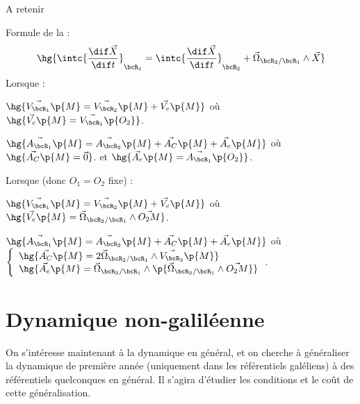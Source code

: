     \begin{form}{A retenir}{}
        \begin{enumerate}
            \itt Formule de la  :
            \[ \hg{\intc{\dfrac{\dif \vec X}{\dif t}}_{\bcR_1} = \intc{\dfrac{\dif \vec X}{\dif t}}_{\bcR_2} + \vec \Omega_{\bcR_2 / \bcR_1} \wedge \vec{ X}}\]
            \itt Lorsque  :
            \begin{enumerate}
                \itast $\hg{\vec{V_{\bcR_1}}\p{M} = \vec{V_{\bcR_2}}\p{M} + \vec{V_e}\p{M}}$ où $\hg{\vec{V_e}\p{M} = \vec{V_{\bcR_1}}\p{O_2}}$.
                
                \itast $\hg{\vec{A_{\bcR_1}}\p{M} = \vec{A_{\bcR_2}}\p{M} + \vec{A_C}\p{M} + \vec{A_e}\p{M}}$ où $\hg{\vec{A_C}\p{M} = \vec 0}$. et $\hg{\vec{A_e}\p{M} = \vec{A_{\bcR_1}}\p{O_2}}$.
            \end{enumerate}
            
            \itt Lorsque  (donc $O_1 = O_2$ fixe) :
            \begin{enumerate}
                \itast $\hg{\vec{V_{\bcR_1}}\p{M} = \vec{V_{\bcR_2}}\p{M} + \vec{V_e}\p{M}}$ où $\hg{\vec{V_e}\p{M} = \vec\Omega_{\bcR_2/\bcR_1} \wedge \vec{O_2M}}$.
                
                \itast $\hg{\vec{A_{\bcR_1}}\p{M} = \vec{A_{\bcR_2}}\p{M} + \vec{A_C}\p{M} + \vec{A_e}\p{M}}$ où $\left\lbrace\begin{array}{l}
                    \hg{\vec{A_C}\p{M} = 2\vec\Omega_{\bcR_2/\bcR_1} \wedge \vec{V_{\bcR_2}}\p{M}} \\
                    \hg{\vec{A_e}\p{M} = \vec\Omega_{\bcR_2/\bcR_1} \wedge \p{\vec\Omega_{\bcR_2/\bcR_1} \wedge \vec{O_2M}}}
                \end{array}\right. $.
            \end{enumerate}
        \end{enumerate}
    
    \end{form}
        
    \section{Dynamique non-galiléenne}
    
    On s'intéresse maintenant à la dynamique en général, et on cherche à généraliser la dynamique de première année (uniquement dans les référentiels galéliens) à des référentiels quelconques en général. Il s'agira d'étudier les conditions et le coût de cette généralisation.
    
